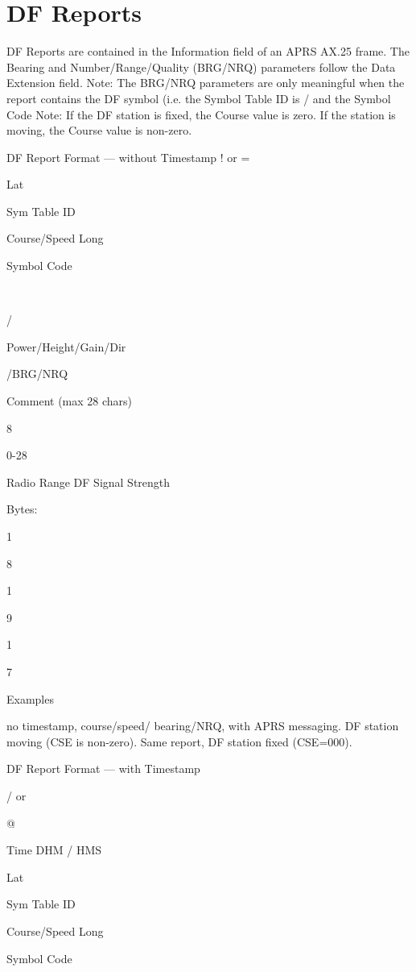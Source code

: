 \section{DF Reports}

DF Reports are contained in the Information field of an APRS AX.25 frame.
The Bearing and Number/Range/Quality (BRG/NRQ) parameters follow the
Data Extension field.
Note: The BRG/NRQ parameters are only meaningful when the report
contains the DF symbol (i.e. the Symbol Table ID is / and the Symbol Code
Note: If the DF station is fixed, the Course value is zero. If the station is
moving, the Course value is non-zero.


DF Report Format — without Timestamp
! or
=

Lat

Sym
Table
ID

Course/Speed
Long

Symbol
Code

\

/

Power/Height/Gain/Dir

/BRG/NRQ

Comment
(max 28
chars)

8

0-28

Radio Range
DF Signal Strength

Bytes:

1

8

1

9

1

7

Examples




no timestamp, course/speed/
bearing/NRQ, with APRS messaging.
DF station moving (CSE is non-zero).
Same report, DF station fixed
(CSE=000).


DF Report Format — with Timestamp

/ or

@

Time
DHM /
HMS

Lat

Sym
Table
ID

Course/Speed
Long

Symbol
Code

